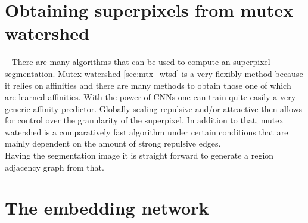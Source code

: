 \section{Obtaining superpixels from mutex watershed}~\label{seg:pip_mutex}
There are many algorithms that can be used to compute an superpixel segmentation. Mutex watershed \ref{sec:mtx_wtsd} is a very flexibly method because it relies on affinities and there are many methods to obtain those one of which are learned affinities. With the power of CNNs one can train quite easily a very generic affinity predictor. Globally scaling repulsive and/or attractive then allows for control over the granularity of the superpixel. In addition to that, mutex watershed is a comparatively fast algorithm under certain conditions that are mainly dependent on the amount of strong repulsive edges.\\
Having the segmentation image it is straight forward to generate a region adjacency graph from that.

\section{The embedding network}~\label{seg:pip_embed}

